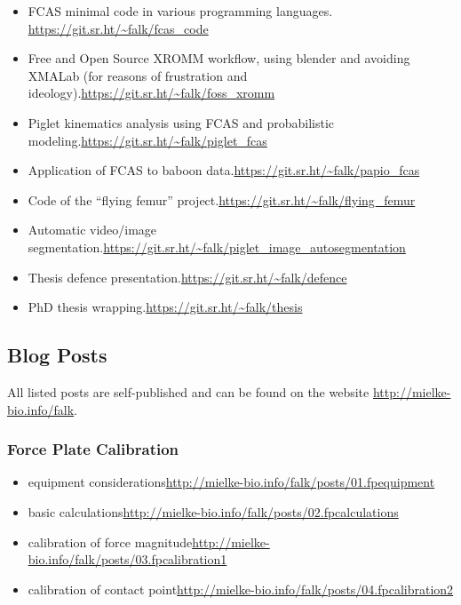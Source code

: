 \begin{change}
\begin{itemize}
\item FCAS minimal code in various programming languages. \newline \url{https://git.sr.ht/\~falk/fcas\_code}
\item Free and Open Source XROMM workflow, using blender and avoiding XMALab (for reasons of frustration and ideology).\newline \url{https://git.sr.ht/\~falk/foss\_xromm}
\item Piglet kinematics analysis using FCAS and probabilistic modeling.\newline \url{https://git.sr.ht/\~falk/piglet\_fcas}
\item Application of FCAS to baboon data.\newline \url{https://git.sr.ht/\~falk/papio\_fcas}
\item Code of the ``flying femur'' project.\newline \url{https://git.sr.ht/\~falk/flying\_femur}
\item Automatic video/image segmentation.\newline \url{https://git.sr.ht/\~falk/piglet\_image\_autosegmentation}
\item Thesis defence presentation.\newline \url{https://git.sr.ht/\~falk/defence}
\item PhD thesis wrapping.\newline \url{https://git.sr.ht/\~falk/thesis}
\end{itemize}
\subsection{Blog Posts}
\label{sec:org55b0e74}
All listed posts are self-published and can be found on the website \url{http://mielke-bio.info/falk}.
\subsubsection{Force Plate Calibration}
\label{sec:org1101dcb}
\begin{itemize}
\item equipment considerations\newline \url{http://mielke-bio.info/falk/posts/01.fpequipment}
\item basic calculations\newline \url{http://mielke-bio.info/falk/posts/02.fpcalculations}
\item calibration of force magnitude\newline \url{http://mielke-bio.info/falk/posts/03.fpcalibration1}
\item calibration of contact point\newline \url{http://mielke-bio.info/falk/posts/04.fpcalibration2}
\end{itemize}

\end{change}
